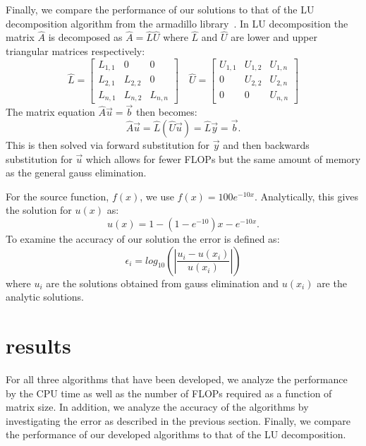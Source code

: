\documentclass[prc,amsmath,twocolumn,superscriptaddress]{revtex4}
\begin{document}
Finally, we compare the performance of our solutions to that of the LU decomposition algorithm from the armadillo library~\cite{armadillo}. In LU decomposition the matrix $\hat{A}$ is decomposed as $\hat{A}=\hat{L}\hat{U}$ where $\hat{L}$ and $\hat{U}$ are lower and upper triangular matrices respectively:
\begin{equation}
\hat{L}=\begin{bmatrix} L_{1,1} & 0&0 \\ L_{2,1}  & L_{2,2} &0 \\ L_{n,1}  & L_{n,2}  &L_{n,n}\end{bmatrix} \quad
\hat{U}=\begin{bmatrix} U_{1,1} & U_{1,2}& U_{1,n}\\ 0  & U_{2,2} &U_{2,n} \\ 0  & 0  &U_{n,n}\end{bmatrix} 
\end{equation}
The matrix equation $\hat{A}\vec{u}=\vec{b}$ then becomes:
\begin{equation}
\hat{A}\vec{u}=\hat{L}(\hat{U}\vec{u})=\hat{L}\vec{y}=\vec{b}.
\end{equation}
This is then solved via forward substitution for $\vec{y}$ and then backwards substitution for $\vec{u}$ which allows for fewer FLOPs but the same amount of memory as the general gauss elimination.

For the source function, $f(x)$, we use $f(x)=100e^{-10x}$. Analytically, this gives the solution for $u(x)$ as:
\begin{equation}
u(x)=1-(1-e^{-10})x-e^{-10x}.
\end{equation}
To examine the accuracy of our solution the error is defined as:
\begin{equation}
\epsilon_i=log_{10}\left(\left|\frac{u_i-u(x_i)}{u(x_i)}\right|\right)
\label{error}
\end{equation}
where $u_i$ are the solutions obtained from gauss elimination and $u(x_i)$ are the analytic solutions.

\section{results}
\label{results}
For all three algorithms that have been developed, we analyze the performance by the CPU time as well as the number of FLOPs required as a function of matrix size. In addition, we analyze the accuracy of the algorithms by investigating the error as described in the previous section. Finally, we compare the performance of our developed algorithms to that of the LU decomposition. \\
\end{document}
